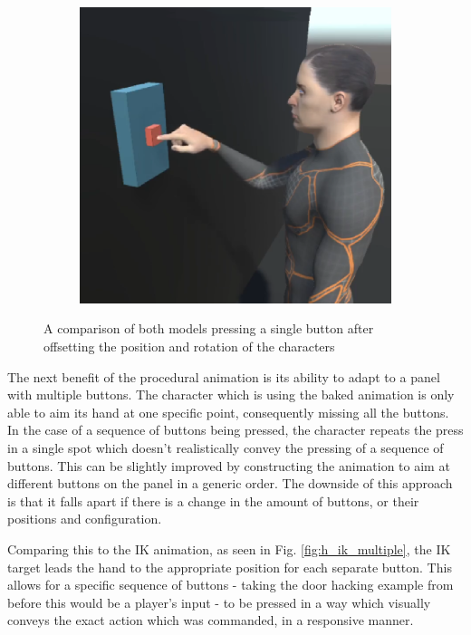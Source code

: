 \begin{figure}[h!]
\begin{subfigure}{0.4\textwidth}
        \includegraphics[width=\linewidth]{grafika/h_ik_offset.eps}
        \label{fig:h_ik_offset}
    \end{subfigure}
    \caption{A comparison of both models pressing a single button after
    offsetting the position and rotation of the characters}
    \label{fig:h_offset}
\end{figure}

The next benefit of the procedural animation is its ability to adapt to a panel
with multiple buttons. The character which is using the baked animation is only
able to aim its hand at one specific point, consequently missing all the
buttons. In the case of a sequence of buttons being pressed, the character
repeats the press in a single spot which doesn't realistically convey the
pressing of a sequence of buttons. This can be slightly improved by constructing
the animation to aim at different buttons on the panel in a generic order. The
downside of this approach is that it falls apart if there is a change in the
amount of buttons, or their positions and configuration. 

Comparing this to the IK animation, as seen in Fig. \ref{fig:h_ik_multiple},
the IK target leads the hand to the appropriate position for each separate
button. This allows for a specific sequence of buttons - taking the door hacking
example from before this would be a player's input - to be pressed in a way
which visually conveys the exact action which was commanded, in a responsive
manner.

